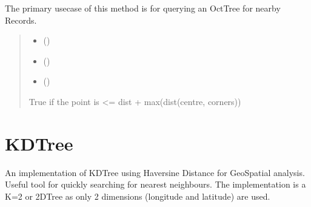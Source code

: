 \documentclass[letterpaper,10pt,english]{sphinxmanual}
\begin{document}
\begin{fulllineitems}
\begin{fulllineitems}
\sphinxAtStartPar
The primary use\sphinxhyphen{}case of this method is for querying an OctTree for
nearby Records.
\begin{quote}\begin{description}
\begin{itemize}
\item {} 
\sphinxAtStartPar
{} ({\hyperref[\detokenize{users_guide:GeoSpatialTools.octtree.SpaceTimeRecord}]{}})

\item {} 
\sphinxAtStartPar
{} (\sphinxstyleliteralemphasis{\sphinxupquote{,}})

\item {} 
\sphinxAtStartPar
{} ()

\end{itemize}

\sphinxAtStartPar
{}

\sphinxAtStartPar
True if the point is \textless{}= dist + max(dist(centre, corners))

\end{description}\end{quote}

\end{fulllineitems}


\end{fulllineitems}


\section{KDTree}
\label{\detokenize{users_guide:kdtree}}\label{\detokenize{users_guide:module-GeoSpatialTools.kdtree}}
\sphinxAtStartPar
An implementation of KDTree using Haversine Distance for GeoSpatial analysis.
Useful tool for quickly searching for nearest neighbours. The implementation is
a K=2 or 2DTree as only 2 dimensions (longitude and latitude) are used.
\end{document}
